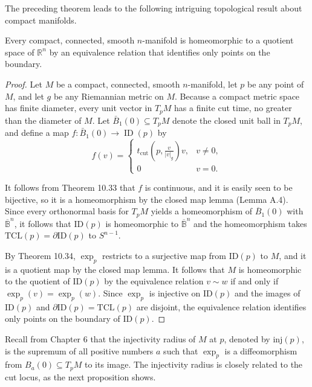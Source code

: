 The preceding theorem leads to the following intriguing topological result about compact manifolds.

\begin{corollary}
\label{cor:compact-manifold-quotient}
Every compact, connected, smooth $n$-manifold is homeomorphic to a quotient space of $\mathbb{R}^n$ by an equivalence relation that identifies only points on the boundary.

\begin{proof}
Let $M$ be a compact, connected, smooth $n$-manifold, let $p$ be any point of $M$, and let $g$ be any Riemannian metric on $M$. Because a compact metric space has finite diameter, every unit vector in $T_p M$ has a finite cut time, no greater than the diameter of $M$. Let $\bar{B}_1(0) \subseteq T_p M$ denote the closed unit ball in $T_p M$, and define a map $f : \bar{B}_1(0) \to \operatorname{ID}(p)$ by
\[
f(v) = \begin{cases}
t_{\operatorname{cut}}\left(p, \frac{v}{|v|_g}\right) v, & v \neq 0, \\
0 & v = 0.
\end{cases}
\]

It follows from Theorem 10.33 that $f$ is continuous, and it is easily seen to be bijective, so it is a homeomorphism by the closed map lemma (Lemma A.4). Since every orthonormal basis for $T_pM$ yields a homeomorphism of $\overline{B}_1(0)$ with $\overline{\mathbb{B}}^n$, it follows that $\text{ID}(p)$ is homeomorphic to $\overline{\mathbb{B}}^n$ and the homeomorphism takes $\text{TCL}(p) = \partial \text{ID}(p)$ to $S^{n-1}$.

By Theorem 10.34, $\exp_p$ restricts to a surjective map from $\text{ID}(p)$ to $M$, and it is a quotient map by the closed map lemma. It follows that $M$ is homeomorphic to the quotient of $\text{ID}(p)$ by the equivalence relation $v \sim w$ if and only if $\exp_p(v) = \exp_p(w)$. Since $\exp_p$ is injective on $\text{ID}(p)$ and the images of $\text{ID}(p)$ and $\partial \text{ID}(p) = \text{TCL}(p)$ are disjoint, the equivalence relation identifies only points on the boundary of $\text{ID}(p)$.
\end{proof}
\end{corollary}

Recall from Chapter 6 that the injectivity radius of $M$ at $p$, denoted by $\text{inj}(p)$, is the supremum of all positive numbers $a$ such that $\exp_p$ is a diffeomorphism from $B_a(0) \subseteq T_pM$ to its image. The injectivity radius is closely related to the cut locus, as the next proposition shows.

